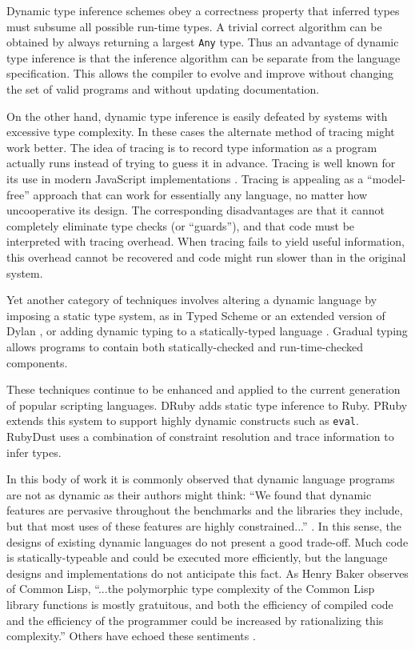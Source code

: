 
Dynamic type inference schemes obey a correctness property that
inferred types must subsume all possible run-time
types. A trivial correct algorithm can be obtained by always returning
a largest \texttt{Any} type. Thus an advantage of dynamic type inference is
that the inference algorithm can be separate from the language specification.
This allows the compiler to evolve and improve without changing the set of
valid programs and without updating documentation.

On the other hand, dynamic type inference is easily defeated by systems with
excessive type complexity. In these cases the alternate method of
tracing \cite{tracingjit} might work better.
The idea of tracing is to record type
information as a program actually runs instead of trying to guess it in
advance. Tracing is well known for its use in modern JavaScript
implementations \cite{tracingjit2}.
Tracing is appealing as a ``model-free'' approach that can work for
essentially any language, no matter how uncooperative its design. The
corresponding disadvantages are that it cannot completely eliminate type
checks (or ``guards''), and that code must be interpreted with tracing overhead.
When tracing fails to yield useful information, this overhead cannot be
recovered and code might run slower than in the original system.

Yet another category of techniques involves altering a dynamic language
by imposing a static type system, as in Typed Scheme \cite{typedscheme}
or an extended version of Dylan \cite{dylantypes}, or adding dynamic typing
to a statically-typed
language \cite{dyntype}. Gradual typing \cite{gradualobjects} allows programs
to contain both statically-checked and run-time-checked components.

These techniques continue to be enhanced and applied to the current
generation of popular scripting languages. DRuby \cite{druby} adds static
type inference to Ruby. PRuby \cite{profileguided} extends this system to
support highly dynamic constructs such as \texttt{eval}. RubyDust
\cite{rubydust} uses a combination of constraint resolution and trace
information to infer types.

In this body of work it is commonly observed that dynamic language programs
are not as dynamic as their authors might think: ``We found that dynamic
features are pervasive throughout the benchmarks and the libraries they
include, but that most uses of these features are highly constrained...''
\cite{profileguided}. In this sense, the designs of existing dynamic languages
do not present a good trade-off. Much code is statically-typeable and could be
executed more efficiently, but the language designs and implementations do not
anticipate this fact. As Henry Baker observes of Common Lisp, ``...the
polymorphic type complexity of the Common Lisp library functions is mostly
gratuitous, and both the efficiency of compiled code and the efficiency of the
programmer could be increased by rationalizing this complexity.''\cite{nimble}
Others have echoed these sentiments \cite{lispcrit}.

